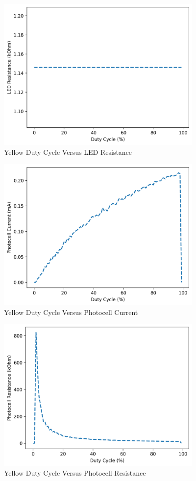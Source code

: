 \documentclass[12pt,titlepage]{article}
\begin{document}
\begin{figure}[!htb]
  \centering
  \includegraphics[width=4in]{lab_4/yellow_duty_cycle_led_res.png}
  \caption{Yellow Duty Cycle Versus LED Resistance}
\end{figure}
\begin{figure}[!htb]
  \centering
  \includegraphics[width=4in]{lab_4/yellow_duty_cycle_photo_curr.png}
  \caption{Yellow Duty Cycle Versus Photocell Current}
\end{figure}
\begin{figure}[!htb]
\centering
\includegraphics[width=4in]{lab_4/yellow_duty_cycle_photo_res.png}
\caption{Yellow Duty Cycle Versus Photocell Resistance}
\end{figure}
\end{document}
